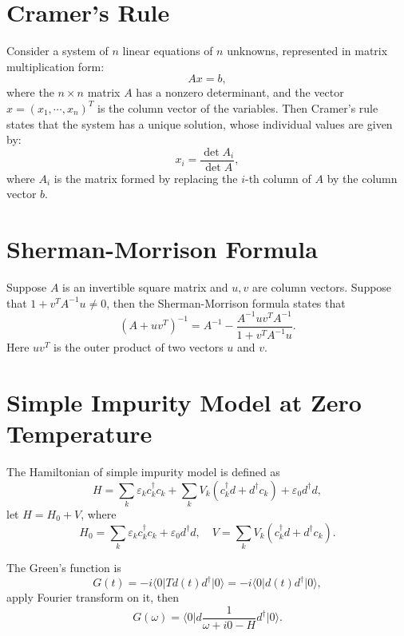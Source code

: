 \documentclass{book}
\newcommand{\bra}[1]{{\langle#1|}}
\newcommand{\ket}[1]{{|#1\rangle}}
\numberwithin{equation}{section}
\begin{document}
\section{Cramer's Rule}
Consider a system of $n$ linear equations of $n$ unknowns, represented in 
matrix multiplication form:
\begin{equation}
  Ax=b,
\end{equation}
where the $n\times n$ matrix $A$ has a nonzero determinant, and the
vector $x=(x_1,\cdots,x_n)^T$ is the column vector of the variables.
Then Cramer's rule states that the system has a unique solution, whose
individual values are given by:
\begin{equation}
  x_i=\frac{\det A_i}{\det A},
\end{equation}
where $A_i$ is the matrix formed by replacing the $i$-th column of $A$
by the column vector $b$.



\section{Sherman-Morrison Formula}
Suppose $A$ is an invertible square matrix and $u,v$ are column
vectors. Suppose that $1+v^TA^{-1}u\ne0$, then the Sherman-Morrison formula
states that
\begin{equation}
  (A+uv^T)^{-1}=A^{-1}-\frac{A^{-1}uv^TA^{-1}}{1+v^TA^{-1}u}.
\end{equation}
Here $uv^T$ is the outer product of two vectors $u$ and $v$.
\section{Simple Impurity Model at Zero Temperature}
The Hamiltonian of simple impurity model is defined as
\begin{equation}
  H=\sum_k\varepsilon_kc_k^\dag c_k+\sum_kV_k(c_k^\dag d+d^\dag c_k)
  +\varepsilon_0d^\dag d,
\end{equation}
let $H=H_0+V$, where
\begin{equation}
  H_0=\sum_k\varepsilon_kc_k^\dag c_k+\varepsilon_0d^\dag d,\quad
  V=\sum_kV_k(c_k^\dag d+d^\dag c_k).
\end{equation}

The Green's function is
\begin{equation}
  G(t)=-i\bra{0}Td(t)d^\dag\ket{0}=-i\bra{0}d(t)d^\dag\ket{0},
\end{equation}
apply Fourier transform on it, then
\begin{equation}
  G(\omega)=\bra{0}d\frac{1}{\omega+i0-H}d^\dag\ket{0}.
\end{equation}
\end{document}
